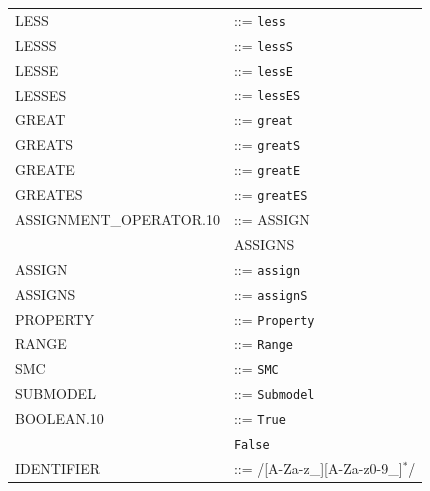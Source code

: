 \begin{longtable}{
>{\ttfamily\small}p{}
>{\raggedright\arraybackslash\small}p{}
}
LESS & ::= \texttt{less}\\

LESSS & ::= \texttt{lessS}\\

LESSE & ::= \texttt{lessE}\\

LESSES & ::= \texttt{lessES}\\

GREAT & ::= \texttt{great}\\

GREATS & ::= \texttt{greatS}\\

GREATE & ::= \texttt{greatE}\\

GREATES & ::= \texttt{greatES}\\

ASSIGNMENT\_OPERATOR.10 & ::= ASSIGN\\
& \textbar{} ASSIGNS\\

ASSIGN & ::= \texttt{assign}\\

ASSIGNS & ::= \texttt{assignS}\\

PROPERTY & ::= \texttt{Property}\\

RANGE & ::= \texttt{Range}\\

SMC & ::= \texttt{SMC}\\

SUBMODEL & ::= \texttt{Submodel}\\

BOOLEAN.10 & ::= \texttt{True}\\
& \textbar{} \texttt{False}\\

IDENTIFIER & ::= /[A-Za-z_][A-Za-z0-9_]$^{*}$/\\

\end{longtable}
\endgroup